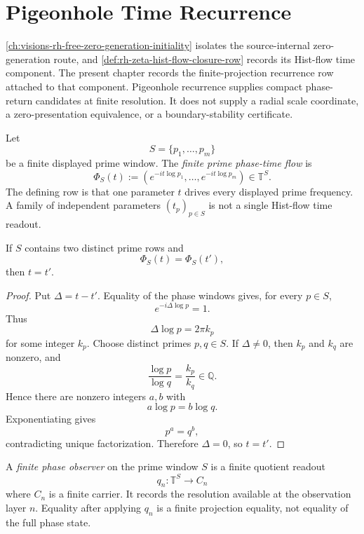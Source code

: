 \chapter{Pigeonhole Time Recurrence}
\label{ch:visions-rh-pigeonhole-time-recurrence}

\autoref{ch:visions-rh-free-zero-generation-initiality} isolates the
source-internal zero-generation route, and
\autoref{def:rh-zeta-hist-flow-closure-row} records its Hist-flow time
component. The present chapter records the finite-projection recurrence
row attached to that component. Pigeonhole recurrence supplies compact
phase-return candidates at finite resolution. It does not supply a radial
scale coordinate, a zero-presentation equivalence, or a boundary-stability
certificate.

\begin{definition}
\label{def:rh-finite-prime-phase-time-flow}
Let
$$
S=\{p_1,\ldots,p_m\}
$$
be a finite displayed prime window. The \emph{finite prime phase-time
flow} is
$$
\Phi_S(t)
:=
\left(
e^{-it\log p_1},
\ldots,
e^{-it\log p_m}
\right)
\in\mathbb T^S.
$$
The defining row is that one parameter $t$ drives every displayed prime
frequency. A family of independent parameters $(t_p)_{p\in S}$ is not a
single Hist-flow time readout.
\end{definition}

\begin{theorem}
\label{thm:rh-exact-finite-prime-phase-time-unique}
If $S$ contains two distinct prime rows and
$$
\Phi_S(t)=\Phi_S(t'),
$$
then $t=t'$.
\end{theorem}

\begin{proof}
Put $\Delta=t-t'$. Equality of the phase windows gives, for every
$p\in S$,
$$
e^{-i\Delta\log p}=1.
$$
Thus
$$
\Delta\log p=2\pi k_p
$$
for some integer $k_p$. Choose distinct primes $p,q\in S$. If
$\Delta\ne0$, then $k_p$ and $k_q$ are nonzero, and
$$
\frac{\log p}{\log q}
=
\frac{k_p}{k_q}
\in\mathbb Q.
$$
Hence there are nonzero integers $a,b$ with
$$
a\log p=b\log q.
$$
Exponentiating gives
$$
p^a=q^b,
$$
contradicting unique factorization. Therefore $\Delta=0$, so $t=t'$.
\end{proof}

\begin{definition}
\label{def:rh-finite-phase-observer}
A \emph{finite phase observer} on the prime window $S$ is a finite
quotient readout
$$
q_n:\mathbb T^S\to C_n
$$
where $C_n$ is a finite carrier. It records the resolution available at
the observation layer $n$. Equality after applying $q_n$ is a finite
projection equality, not equality of the full phase state.
\end{definition}

